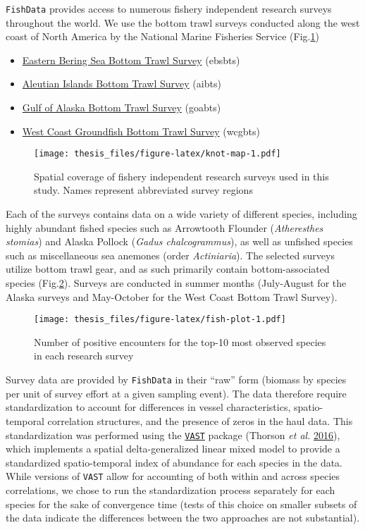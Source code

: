 \documentclass[twoside,12pt,final]{ucthesis-CA2012}
\providecommand{\tightlist}{%
  \setlength{\itemsep}{0pt}\setlength{\parskip}{0pt}}
\begin{document}
\begin{ucmainmatter}
\texttt{FishData} provides access to numerous fishery independent
research surveys throughout the world. We use the bottom trawl surveys
conducted along the west coast of North America by the National Marine
Fisheries Service (Fig.\ref{fig:knot-map})
\begin{itemize}
\tightlist
\item
  \href{https://www.afsc.noaa.gov/RACE/groundfish/bottom\%20trawl\%20surveys.php}{Eastern
  Bering Sea Bottom Trawl Survey} (ebsbts)
\item
  \href{https://www.afsc.noaa.gov/RACE/groundfish/bottom\%20trawl\%20surveys.php}{Aleutian
  Islands Bottom Trawl Survey} (aibts)
\item
  \href{https://www.afsc.noaa.gov/RACE/groundfish/bottom\%20trawl\%20surveys.php}{Gulf
  of Alaska Bottom Trawl Survey} (goabts)
\item
  \href{https://www.nwfsc.noaa.gov/research/divisions/fram/groundfish/bottom_trawl.cfm}{West
  Coast Groundfish Bottom Trawl Survey} (wcgbts) 
\end{itemize}
\begin{figure}
\centering
\texttt{[image: thesis\_files/figure-latex/knot-map-1.pdf]}
\caption{\label{fig:knot-map}Spatial coverage of fishery independent
research surveys used in this study. Names represent abbreviated survey
regions}
\end{figure}
Each of the surveys contains data on a wide variety of different
species, including highly abundant fished species such as Arrowtooth
Flounder (\emph{Atheresthes stomias}) and Alaska Pollock (\emph{Gadus
chalcogrammus}), as well as unfished species such as miscellaneous sea
anemones (order \emph{Actiniaria}). The selected surveys utilize bottom
trawl gear, and as such primarily contain bottom-associated species
(Fig.\ref{fig:fish-plot}). Surveys are conducted in summer months
(July-August for the Alaska surveys and May-October for the West Coast
Bottom Trawl Survey).
\begin{figure}
\centering
\texttt{[image: thesis\_files/figure-latex/fish-plot-1.pdf]}
\caption{\label{fig:fish-plot}Number of positive encounters for the top-10
most observed species in each research survey}
\end{figure}
Survey data are provided by \texttt{FishData} in their ``raw'' form
(biomass by species per unit of survey effort at a given sampling
event). The data therefore require standardization to account for
differences in vessel characteristics, spatio-temporal correlation
structures, and the presence of zeros in the haul data. This
standardization was performed using the
\href{https://github.com/James-Thorson/VAST}{\texttt{VAST}} package
(Thorson \emph{et al.} \protect\hyperlink{ref-Thorson2016a}{2016}),
which implements a spatial delta-generalized linear mixed model to
provide a standardized spatio-temporal index of abundance for each
species in the data. While versions of \texttt{VAST} allow for
accounting of both within and across species correlations, we chose to
run the standardization process separately for each species for the sake
of convergence time (tests of this choice on smaller subsets of the data
indicate the differences between the two approaches are not
substantial).


\end{ucmainmatter}
\end{document}

